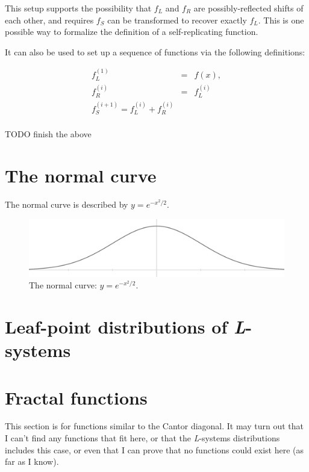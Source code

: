 \documentclass[]{article}
\begin{document}
This setup supports the possibility that \(f_L\) and \(f_R\) are
possibly-reflected shifts of each other, and requires \(f_S\) can be
transformed to recover exactly \(f_L\). This is one possible way to
formalize the definition of a self-replicating function.

It can also be used to set up a sequence of functions via the following
definitions:

\[\begin{array}{rcl}
  f^{(1)}_L & = & f(x), \\
  f^{(i)}_R & = & f^{(i)}_L \\
  f^{(i+1)}_S = f^{(i)}_L + f^{(i)}_R \\
\end{array}\]

TODO finish the above

\section{The normal curve}\label{the-normal-curve}

The normal curve is described by \(y = e^{-x^2/2}\).

\begin{figure}[htbp]
\centering
\includegraphics{images/pdfs/normal3.pdf}
\caption{The normal curve: \(y=e^{-x^2/2}\).}
\end{figure}

\section{\texorpdfstring{Leaf-point distributions of
\emph{L}-systems}{Leaf-point distributions of L-systems}}\label{leaf-point-distributions-of-l-systems}

\section{Fractal functions}\label{fractal-functions}

This section is for functions similar to the Cantor diagonal. It may
turn out that I can't find any functions that fit here, or that the
\emph{L}-systems distributions includes this case, or even that I can
prove that no functions could exist here (as far as I know).
\end{document}
